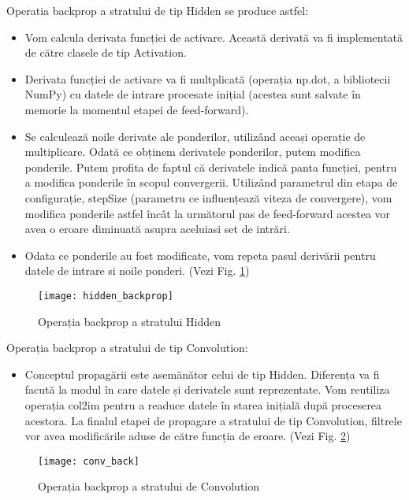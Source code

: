 	\vfill
	Operatia backprop a stratului de tip Hidden se produce astfel:
	\begin{itemize}
	\item	Vom calcula derivata funcției de activare. Această derivată va fi implementată de către clasele de tip Activation.
	
	\item	Derivata funcției de activare va fi multplicată (operația np.dot, a bibliotecii NumPy) cu datele de intrare procesate inițial (acestea sunt salvate în memorie la momentul etapei de feed-forward).
	
	
	\item	Se calculează noile derivate ale ponderilor, utilizând aceași operație de multiplicare. Odată ce obținem derivatele ponderilor, putem modifica ponderile. Putem profita de faptul că derivatele indică panta funcției, pentru a modifica ponderile în scopul convergerii. Utilizând parametrul din etapa de configurație, stepSize (parametru ce influențează viteza de convergere), vom modifica ponderile astfel încât la următorul pas de feed-forward acestea vor avea o eroare diminuată asupra aceluiasi set de intrări.
	
	\item	Odata ce ponderile au fost modificate, vom repeta pasul derivării pentru datele de intrare si noile ponderi. (Vezi Fig. \ref{fig:hidden_backprop})\newline
	\end{itemize}	

	\begin{figure}[H]
	\texttt{[image: hidden\_backprop]}
	\caption{\label{fig:hidden_backprop} Operația backprop a stratului Hidden}
	\end{figure}



	Operația backprop a stratului de tip Convolution:
	\begin{itemize}
	\item	Conceptul propagării este asemănător celui de tip Hidden. Diferența va fi facută la modul în care datele și derivatele sunt reprezentate. Vom reutiliza operația col2im pentru a readuce datele în starea inițială după proceserea acestora.
	La finalul etapei de propagare a stratului de tip Convolution, filtrele vor avea modificările aduse de către funcția de eroare. (Vezi Fig. \ref{fig:conv_backprop})
	\end{itemize}

	\begin{figure}[H]
	\texttt{[image: conv\_back]}
	\caption{\label{fig:conv_backprop} Operația backprop a stratului de Convolution}
	\end{figure}
	


